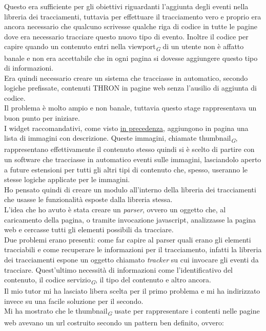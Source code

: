 \documentclass[a4paper, 12pt, twoside, openright]{book}
\newcommand{\gloss}[1]{#1\textsubscript{\textit{\tiny{G}}}}
\begin{document}
Questo era sufficiente per gli obiettivi riguardanti l'aggiunta degli eventi nella libreria dei tracciamenti, tuttavia per effettuare il tracciamento vero e proprio era ancora necessario che qualcuno scrivesse qualche riga di codice in tutte le pagine dove era necessario tracciare questo nuovo tipo di evento. Inoltre il codice per capire quando un contenuto entri nella \gloss{viewport} di un utente non è affatto banale e non era accettabile che in ogni pagina si dovesse aggiungere questo tipo di informazioni.\\
Era quindi necessario creare un sistema che tracciasse in automatico, secondo logiche prefissate, contenuti THRON in pagine web senza l'ausilio di aggiunta di codice.\\
Il problema è molto ampio e non banale, tuttavia questo stage rappresentava un buon punto per iniziare.\\
I widget raccomandativi, come visto \hyperref[pcr-example]{in precedenza}, aggiungono in pagina una lista di immagini con descrizione. Queste immagini, chiamate \gloss{thumbnail}, rappresentano effettivamente il contenuto stesso quindi si è scelto di partire con un software che tracciasse in automatico eventi sulle immagini, lasciandolo aperto a future estensioni per tutti gli altri tipi di contenuto che, spesso, useranno le stesse logiche applicate per le immagini.\\
Ho pensato quindi di creare un modulo all'interno della libreria dei tracciamenti che usasse le funzionalità esposte dalla libreria stessa.\\
L'idea che ho avuto è stata creare un \textit{parser}, ovvero un oggetto che, al caricamento della pagina, o tramite invocazione javascript, analizzasse la pagina web e cercasse tutti gli elementi possibili da tracciare.\\
Due problemi erano presenti: come far capire al parser quali erano gli elementi tracciabili e come recuperare le informazioni per il tracciamento, infatti la libreria dei tracciamenti espone un oggetto chiamato \textit{tracker} su cui invocare gli eventi da tracciare. Quest'ultimo necessità di informazioni come l'identificativo del contenuto, il \gloss{codice servizio}, il tipo del contenuto e altro ancora.\\
Il mio tutor mi ha lasciato libera scelta per il primo problema e mi ha indirizzato invece su una facile soluzione per il secondo.\\
Mi ha mostrato che le \gloss{thumbnail} usate per rappresentare i contenti nelle pagine web avevano un url costruito secondo un pattern ben definito, ovvero:\\ \\
\end{document}
